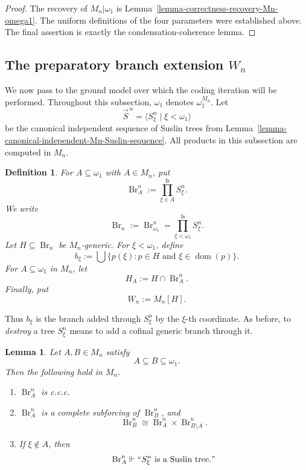 \documentclass[a4paper,11pt]{article}
\newtheorem{lemma}[theorem]{Lemma}
\newtheorem{definition}[theorem]{Definition}
\begin{document}
\begin{proof}
The recovery of $M_n|\omega_1$ is
Lemma~\ref{lemma-correctness-recovery-Mn-omega1}.  The uniform definitions of
the four parameters were established above.  The final assertion is exactly
the condensation-coherence lemma.
\end{proof}



\subsection[The preparatory branch extension Wn]{The preparatory branch extension $W_n$}
\label{subsection-preparatory-branch-extension-Mn}

We now pass to the ground model over which the coding iteration will be
performed.  Throughout this subsection, $\omega_1$ denotes
$\omega_1^{M_n}$.  Let
\[
   \vec S^{\,n}
   =\langle S^n_\xi\mid\xi<\omega_1\rangle
\]
be the canonical independent sequence of Suslin trees from
Lemma~\ref{lemma-canonical-independent-Mn-Suslin-sequence}.  All products in
this subsection are computed in $M_n$.

\begin{definition}
\label{definition-branch-products-over-Mn}
For $A\subseteq\omega_1$ with $A\in M_n$, put
\[
   \operatorname{Br}^n_A
   :=\prod_{\xi\in A}^{\mathrm{fs}}S^n_\xi.
\]
We write
\[
   \operatorname{Br}_n
   :=\operatorname{Br}^n_{\omega_1}
   =\prod_{\xi<\omega_1}^{\mathrm{fs}}S^n_\xi.
\]
Let $H\subseteq\operatorname{Br}_n$ be $M_n$-generic.  For
$\xi<\omega_1$, define
\[
   b_\xi
   :=\bigcup\{p(\xi):p\in H\text{ and }
                     \xi\in\operatorname{dom}(p)\}.
\]
For $A\subseteq\omega_1$ in $M_n$, let
\[
   H_A:=H\cap\operatorname{Br}^n_A.
\]
Finally, put
\[
   W_n:=M_n[H].
\]
\end{definition}

Thus $b_\xi$ is the branch added through $S^n_\xi$ by the $\xi$-th
coordinate.  As before, to \emph{destroy} a tree $S^n_\xi$ means to add a
cofinal generic branch through it.

\begin{lemma}
\label{lemma-branch-product-calculus-Mn}
Let $A,B\in M_n$ satisfy
\[
   A\subseteq B\subseteq\omega_1.
\]
Then the following hold in $M_n$.
\begin{enumerate}
   \item $\operatorname{Br}^n_A$ is c.c.c.
   \item $\operatorname{Br}^n_A$ is a complete subforcing of
         $\operatorname{Br}^n_B$, and
         \[
            \operatorname{Br}^n_B
            \cong
            \operatorname{Br}^n_A
            \times
            \operatorname{Br}^n_{B\setminus A}.
         \]
   \item If $\xi\notin A$, then
         \[
            \operatorname{Br}^n_A\Vdash
            ``S^n_\xi\text{ is a Suslin tree}."
         \]
\end{enumerate}
\end{lemma}
\end{document}
